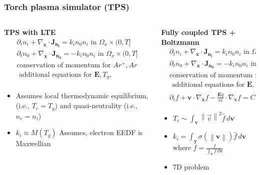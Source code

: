 \documentclass[mathserif, aspectratio=169]{beamer}
\newcommand{\vect}[1]{\boldsymbol{#1}}
\newcommand{\diff}[1]{\, d#1}
\newcommand{\norm}[1]{\left\lVert#1\right\rVert}
\begin{document}
\begin{frame}
	\frametitle{Torch plasma simulator (TPS)}
	\begin{columns}
		\begin{column}{0.48\textwidth}
			\textbf{TPS with LTE}
			\vspace{0.25in}
			\footnotesize
			\begin{align*}
				\partial_t n_i + \nabla_{\vect{x}} \cdot \vect{J_{n_i}}  = k_i n_0 n_i  \text{ in } \Omega_x \times (0,T]\\
				\partial_t n_0 + \nabla_{\vect{x}} \cdot \vect{J_{n_0}}  = -k_i n_0 n_i \text{ in } \Omega_x \times (0,T]\\
				\text{conservation of momentum for }  Ar^{+}, Ar  \\
				\text{ additional equations for } \vect{E}, T_g , \\
			\end{align*}
			\begin{itemize}
				\item Assumes local thermodynamic equilibrium, (i.e., $T_e = T_g$) and quasi-neutrality (i.e., $n_e=n_i$)
				\item $k_i \approx M(T_g)$ Assumes, electron EEDF is Maxwellian
			\end{itemize}
		\end{column}
		\begin{column}{0.48\textwidth}
			\textbf{Fully coupled TPS + Boltzmann}
			\vspace{0.25in}
			\footnotesize
			\begin{align*}
				&\partial_t n_i + \nabla_{\vect{x}} \cdot \vect{J_{n_i}}  = k_i n_0 n_i  \text{ in } \Omega_x \times (0,T]\\
				&\partial_t n_0 + \nabla_{\vect{x}} \cdot \vect{J_{n_0}}  = -k_i n_0 n_i \text{ in } \Omega_x \times (0,T] \\
				&\text{conservation of momentum for }  Ar^{+}, Ar \\
				&\text{ additional equations for } \vect{E}, T_g \\
				&\partial_t f  + \vect{v} \cdot \nabla_{\vect{x}} f -\frac{\vect{E} q}{m} \cdot \nabla_{\vect{v }}f = C(f, n_0, T_g) \text{ in } \Omega_x \times \mathcal{R}^3 \times (0,T]
			\end{align*}
			\begin{itemize}
				\item $T_e \sim \int_{\vect{v}} \norm{\vec{v}}^2 \hat{f} \diff{\vect{v}}$
				\item $k_i = \int_{\vect{v}} \sigma(\norm{\vect{v}}) \hat{f} \diff{\vect{v}}$ where $\hat{f} = \frac{f}{\int_{\vect{v}} f \diff{\vect{v}}}$
				\item 7D problem
			\end{itemize}
		\end{column}
	\end{columns}

\end{frame}
\end{document}

